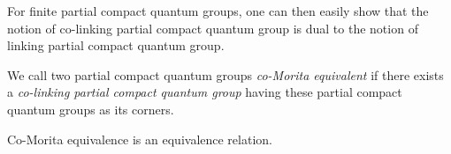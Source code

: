 \begin{Rem} For finite partial compact quantum groups, one can then easily show that the notion of co-linking partial compact quantum group is dual to the notion of linking partial compact quantum group.\end{Rem}

\begin{Def} We call two partial compact quantum groups \emph{co-Morita equivalent} if there exists a \emph{co-linking partial compact quantum group} having these partial compact quantum groups as its corners.
\end{Def}

\begin{Lem} Co-Morita equivalence is an equivalence relation. %
\end{Lem} 


